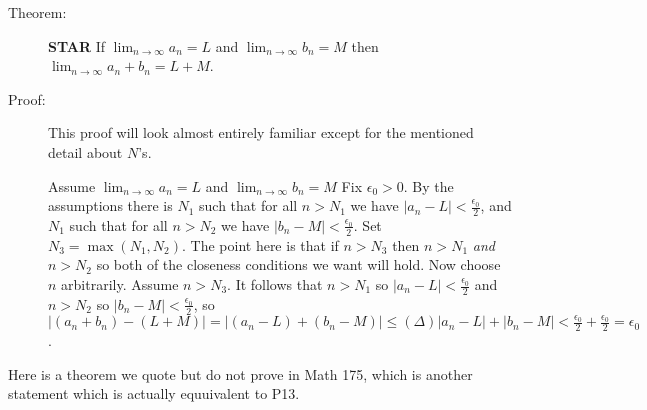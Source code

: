 \documentclass[12pt]{article}
\begin{document}
\begin{description}

\item  [Theorem:]  {\bf STAR}  If $\lim_{n \rightarrow \infty}a_n = L$ and $\lim_{n \rightarrow \infty}b_n = M$ then $\lim_{n \rightarrow \infty}a_n + b_n=L+M$.

\item[Proof:]  This proof will look almost entirely familiar except for the mentioned detail about $N$'s.

Assume $\lim_{n \rightarrow \infty}a_n = L$ and $\lim_{n \rightarrow \infty}b_n = M$  Fix $\epsilon_0>0$.  By the assumptions there is $N_1$ such that for all $n>N_1$ we have $|a_n-L|<\frac{\epsilon_0}2$,
and $N_1$ such that for all $n>N_2$ we have $|b_n-M|<\frac{\epsilon_0}2$.  Set $N_3 = \max(N_1,N_2)$.  The point here is that if $n>N_3$ then $n>N_1$ {\em and\/} $n>N_2$ so both of the closeness conditions we want will hold.
Now choose $n$ arbitrarily.  Assume $n>N_3$.  It follows that $n>N_1$ so $|a_n-L|<\frac{\epsilon_0}2$ and  $n>N_2$ so $|b_n-M|<\frac{\epsilon_0}2$, so $|(a_n+b_n)-(L+M)| = |(a_n-L)+(b_n-M)|\leq (\Delta) |a_n-L|+|b_n-M| < \frac{\epsilon_0}2+\frac{\epsilon_0}2 = \epsilon_0$.



\end{description}

Here is a theorem we quote but do not prove in Math 175, which is another statement which is actually equuivalent to P13.
\end{document}
